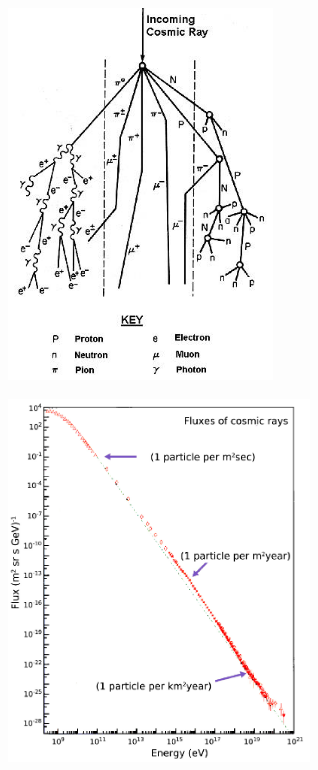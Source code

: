 \begin{minipage}{0.5\textwidth}
    \begin{figure}[H]
        \centering
        \includegraphics[width=7cm]{immagini/radiazione_cosmica.png}
    \end{figure}
\end{minipage}
\begin{minipage}{0.5\textwidth}
    \begin{figure}[H]
        \centering
        \includegraphics[width=8cm]{immagini/energia_radiazione_cosmica.png}
    \end{figure}
\end{minipage}

